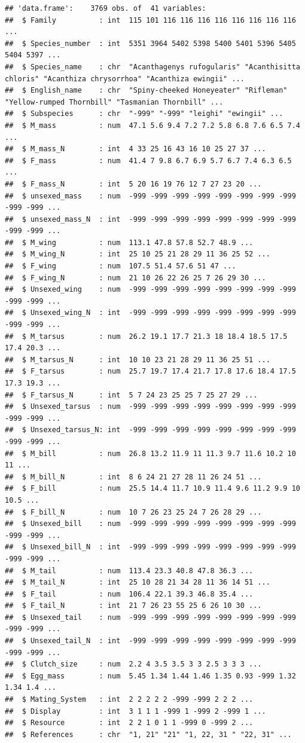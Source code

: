 \documentclass[
  12pt,
]{article}
\begin{document}
\begin{verbatim}
## 'data.frame':    3769 obs. of  41 variables:
##  $ Family          : int  115 101 116 116 116 116 116 116 116 116 ...
##  $ Species_number  : int  5351 3964 5402 5398 5400 5401 5396 5405 5404 5397 ...
##  $ Species_name    : chr  "Acanthagenys rufogularis" "Acanthisitta chloris" "Acanthiza chrysorrhoa" "Acanthiza ewingii" ...
##  $ English_name    : chr  "Spiny-cheeked Honeyeater" "Rifleman" "Yellow-rumped Thornbill" "Tasmanian Thornbill" ...
##  $ Subspecies      : chr  "-999" "-999" "leighi" "ewingii" ...
##  $ M_mass          : num  47.1 5.6 9.4 7.2 7.2 5.8 6.8 7.6 6.5 7.4 ...
##  $ M_mass_N        : int  4 33 25 16 43 16 10 25 27 37 ...
##  $ F_mass          : num  41.4 7 9.8 6.7 6.9 5.7 6.7 7.4 6.3 6.5 ...
##  $ F_mass_N        : int  5 20 16 19 76 12 7 27 23 20 ...
##  $ unsexed_mass    : num  -999 -999 -999 -999 -999 -999 -999 -999 -999 -999 ...
##  $ unsexed_mass_N  : int  -999 -999 -999 -999 -999 -999 -999 -999 -999 -999 ...
##  $ M_wing          : num  113.1 47.8 57.8 52.7 48.9 ...
##  $ M_wing_N        : int  25 10 25 21 28 29 11 36 25 52 ...
##  $ F_wing          : num  107.5 51.4 57.6 51 47 ...
##  $ F_wing_N        : num  21 10 26 22 26 25 7 26 29 30 ...
##  $ Unsexed_wing    : num  -999 -999 -999 -999 -999 -999 -999 -999 -999 -999 ...
##  $ Unsexed_wing_N  : int  -999 -999 -999 -999 -999 -999 -999 -999 -999 -999 ...
##  $ M_tarsus        : num  26.2 19.1 17.7 21.3 18 18.4 18.5 17.5 17.4 20.3 ...
##  $ M_tarsus_N      : int  10 10 23 21 28 29 11 36 25 51 ...
##  $ F_tarsus        : num  25.7 19.7 17.4 21.7 17.8 17.6 18.4 17.5 17.3 19.3 ...
##  $ F_tarsus_N      : int  5 7 24 23 25 25 7 25 27 29 ...
##  $ Unsexed_tarsus  : num  -999 -999 -999 -999 -999 -999 -999 -999 -999 -999 ...
##  $ Unsexed_tarsus_N: int  -999 -999 -999 -999 -999 -999 -999 -999 -999 -999 ...
##  $ M_bill          : num  26.8 13.2 11.9 11 11.3 9.7 11.6 10.2 10 11 ...
##  $ M_bill_N        : int  8 6 24 21 27 28 11 26 24 51 ...
##  $ F_bill          : num  25.5 14.4 11.7 10.9 11.4 9.6 11.2 9.9 10 10.5 ...
##  $ F_bill_N        : num  10 7 26 23 25 24 7 26 28 29 ...
##  $ Unsexed_bill    : num  -999 -999 -999 -999 -999 -999 -999 -999 -999 -999 ...
##  $ Unsexed_bill_N  : int  -999 -999 -999 -999 -999 -999 -999 -999 -999 -999 ...
##  $ M_tail          : num  113.4 23.3 40.8 47.8 36.3 ...
##  $ M_tail_N        : int  25 10 28 21 34 28 11 36 14 51 ...
##  $ F_tail          : num  106.4 22.1 39.3 46.8 35.4 ...
##  $ F_tail_N        : int  21 7 26 23 55 25 6 26 10 30 ...
##  $ Unsexed_tail    : num  -999 -999 -999 -999 -999 -999 -999 -999 -999 -999 ...
##  $ Unsexed_tail_N  : int  -999 -999 -999 -999 -999 -999 -999 -999 -999 -999 ...
##  $ Clutch_size     : num  2.2 4 3.5 3.5 3 3 2.5 3 3 3 ...
##  $ Egg_mass        : num  5.45 1.34 1.44 1.46 1.35 0.93 -999 1.32 1.34 1.4 ...
##  $ Mating_System   : int  2 2 2 2 2 -999 -999 2 2 2 ...
##  $ Display         : int  3 1 1 1 -999 1 -999 2 -999 1 ...
##  $ Resource        : int  2 2 1 0 1 1 -999 0 -999 2 ...
##  $ References      : chr  "1, 21" "21" "1, 22, 31 " "22, 31" ...
\end{verbatim}
\end{document}
